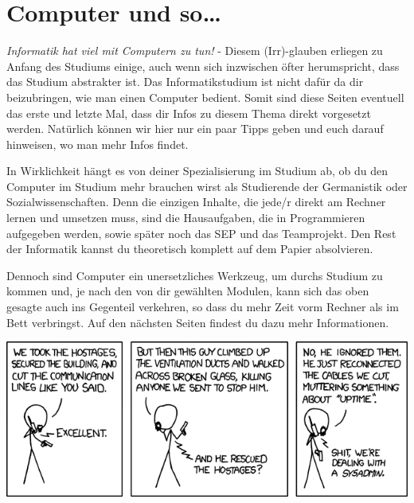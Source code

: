 \section{Computer und so\ldots}
	\begin{multicols}{2}
	\label{computer}
	\emph{Informatik hat viel mit Computern zu tun!} - Diesem (Irr)-glauben erliegen zu Anfang des Studiums einige, auch wenn sich inzwischen öfter herumspricht, dass das Studium abstrakter ist. Das Informatikstudium ist nicht dafür da dir beizubringen, wie man einen Computer bedient. Somit sind diese Seiten eventuell das erste und letzte Mal,  dass dir Infos zu diesem Thema direkt vorgesetzt werden. Natürlich können wir hier nur ein paar Tipps geben und euch darauf hinweisen, wo man mehr Infos  findet.

	In Wirklichkeit hängt es von deiner Spezialisierung im Studium ab, ob  du den Computer im Studium mehr brauchen wirst als  Studierende der Germanistik oder Sozialwissenschaften. Denn die einzigen Inhalte,  die jede/r direkt am Rechner lernen und umsetzen muss, sind die Hausaufgaben,  die in Programmieren aufgegeben werden, sowie später noch das SEP und das Teamprojekt. Den Rest der Informatik kannst du theoretisch komplett auf dem Papier absolvieren.

	Dennoch sind Computer ein unersetzliches Werkzeug, um durchs Studium zu kommen und, je nach den von dir gewählten Modulen, kann sich das oben gesagte auch ins Gegenteil verkehren, so dass du mehr Zeit vorm Rechner als im Bett verbringst. Auf den nächsten Seiten findest du dazu mehr Informationen.






\end{multicols}
\begin{center}
		\includegraphics[totalheight=6cm]{bilder/XKCD/devotion_to_duty}
\end{center}
